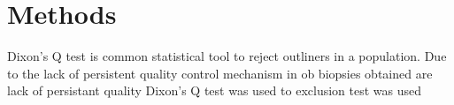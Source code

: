 \chapter{Methods}

Dixon's Q test is common statistical tool to reject outliners in a population. Due to the lack of persistent quality control mechanism in ob biopsies obtained are lack of persistant quality Dixon's Q test was used to   exclusion test was used 
